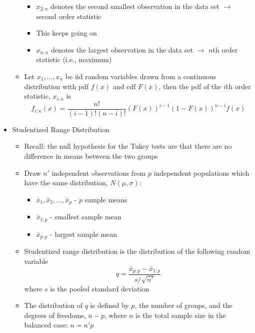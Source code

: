 \documentclass[12pt]{article}
\begin{document}
\begin{itemize}
\begin{itemize}
\begin{itemize}
\item $x_{2:n}$ denotes the second smallest observation in the data set $\to$ second order statistic 
\item This keeps going on
\item $x_{n:n}$ denotes the largest observation in the data set $\to$ $n$th order statistic (i.e., maximum) \end{itemize} 
\item Let $x_1,\dots,x_n$ be iid random variables drawn from a continuous distribution with pdf $f(x)$ and cdf $F(x)$, then the pdf of the $i$th order statistic, $x_{i:n}$ is $$ f_{i:n}(x) = \frac{n!}{(i-1)!(n-i)!}(F(x))^{i-1}(1 - F(x))^{n-i} f(x) $$ \end{itemize} 
\item Studentized Range Distribution \begin{itemize} 
\item Recall: the null hypothesis for the Tukey tests are that there are no difference in means between the two groups 
\item Draw $n'$ independent observations from $p$ independent populations which have the same distribution, $N(\mu, \sigma)$: \begin{itemize} 
\item $\bar{x}_1,\bar{x}_2,\dots,\bar{x}_p$ - $p$ sample means 
\item $\bar{x}_{1:p}$ - smallest sample mean
\item $\bar{x}_{p:p}$ - largest sample mean \end{itemize} 
\item Studentized range distribution is the distribution of the following random variable $$ q = \frac{\bar{x}_{p:p} - \bar{x}_{1:p}}{s / \sqrt{n'}} $$ where $s$ is the pooled standard deviation 
\item The distribution of $q$ is defined by $p$, the number of groups, and the degrees of freedoms, $n - p$, where $n$ is the total sample size in the balanced case: $n = n' p$ \end{itemize} 
\end{itemize}
\end{document}
